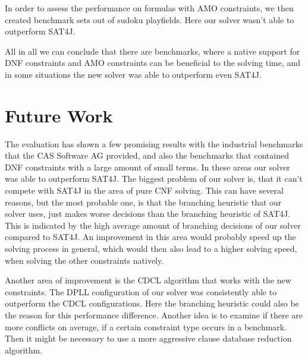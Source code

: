 In order to assess the performance on formulas with AMO constraints, we then created benchmark sets out of sudoku playfields. Here our solver wasn't able to outperform SAT4J.

All in all we can conclude that there are benchmarks, where a native support for DNF constraints and AMO constraints can be beneficial to the solving time, and in some situations the new solver was able to outperform even SAT4J.

\section{Future Work}

The evaluation has shown a few promising results with the industrial benchmarks that the CAS Software AG provided, and also the benchmarks that contained DNF constraints with a large amount of small terms. In these areas our solver was able to outperform SAT4J. The biggest problem of our solver is, that it can't compete with SAT4J in the area of pure CNF solving. This can have several reasons, but the most probable one, is that the branching heuristic that our solver uses, just makes worse decisions than the branching heuristic of SAT4J. This is indicated by the high average amount of branching decisions of our solver compared to SAT4J. An improvement in this area would probably speed up the solving process in general, which would then also lead to a higher solving speed, when solving the other constraints natively.

Another area of improvement is the CDCL algorithm that works with the new constraints. The DPLL configuration of our solver was consistently able to outperform the CDCL configurations. Here the branching heuristic could also be the reason for this performance difference. Another idea is to examine if there are more conflicts on average, if a certain constraint type occurs in a benchmark. Then it might be necessary to use a more aggressive clause database reduction algorithm.